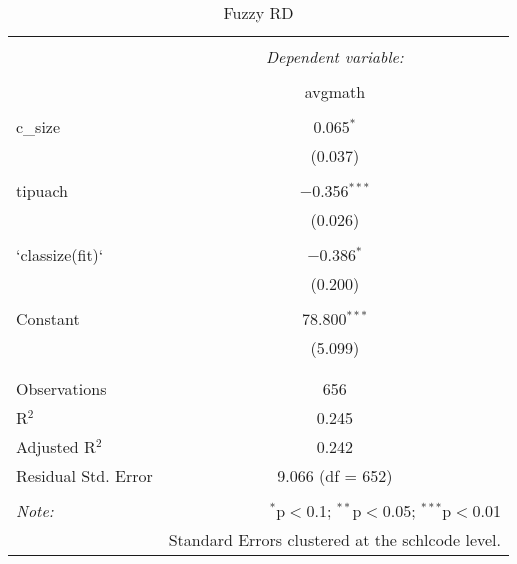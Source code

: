 
\begin{table}[!htbp] \centering 
  \caption{Fuzzy RD} 
  \label{} 
\begin{tabular}{@{\extracolsep{5pt}}lc} 
\\[-1.8ex]\hline 
\hline \\[-1.8ex] 
 & \multicolumn{1}{c}{\textit{Dependent variable:}} \\ 
\cline{2-2} 
\\[-1.8ex] & avgmath \\ 
\hline \\[-1.8ex] 
 c\_size & 0.065$^{*}$ \\ 
  & (0.037) \\ 
  & \\ 
 tipuach & $-$0.356$^{***}$ \\ 
  & (0.026) \\ 
  & \\ 
 `classize(fit)` & $-$0.386$^{*}$ \\ 
  & (0.200) \\ 
  & \\ 
 Constant & 78.800$^{***}$ \\ 
  & (5.099) \\ 
  & \\ 
\hline \\[-1.8ex] 
Observations & 656 \\ 
R$^{2}$ & 0.245 \\ 
Adjusted R$^{2}$ & 0.242 \\ 
Residual Std. Error & 9.066 (df = 652) \\ 
\hline 
\hline \\[-1.8ex] 
\textit{Note:}  & \multicolumn{1}{r}{$^{*}$p$<$0.1; $^{**}$p$<$0.05; $^{***}$p$<$0.01} \\ 
 & \multicolumn{1}{r}{Standard Errors clustered at the schlcode level.} \\ 
\end{tabular} 
\end{table} 
